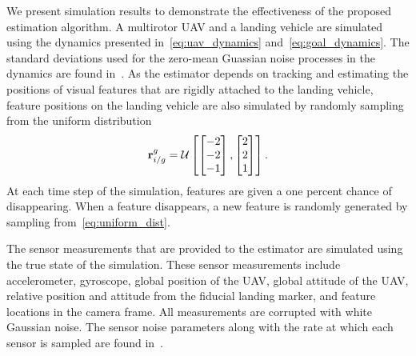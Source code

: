 
We present simulation results to demonstrate the effectiveness of the proposed estimation
algorithm.
A multirotor UAV and a landing vehicle are simulated using the dynamics presented
in~\eqref{eq:uav_dynamics} and~\eqref{eq:goal_dynamics}.
The standard deviations used for the zero-mean
Guassian noise processes in the dynamics are found
in~.
As the estimator depends on
tracking and estimating the positions of visual features that are rigidly
attached to the landing vehicle, feature positions on the landing vehicle
are also simulated by randomly sampling from the uniform distribution
\begin{equation}
  \boldsymbol{\mathrm{r}}_{i/g}^g = \mathcal{U}
  \left[ \begin{bmatrix} -2 \\ -2 \\ -1 \end{bmatrix},
  \begin{bmatrix} 2 \\ 2 \\ 1 \end{bmatrix} \right].
  \label{eq:uniform_dist}
\end{equation}
At each time step of the simulation, features are given a one percent chance
of disappearing. When a feature disappears, a new feature is randomly
generated by sampling from~\eqref{eq:uniform_dist}.

The sensor measurements that are provided to the estimator are simulated using the true
state of the simulation. These sensor measurements include accelerometer,
gyroscope, global position of the UAV, global attitude 
of the UAV, relative position and attitude from the fiducial landing marker, and
feature locations in the camera frame. All measurements are
corrupted with white Gaussian noise. The sensor noise parameters along with the
rate at which each sensor is sampled are found
in~.

